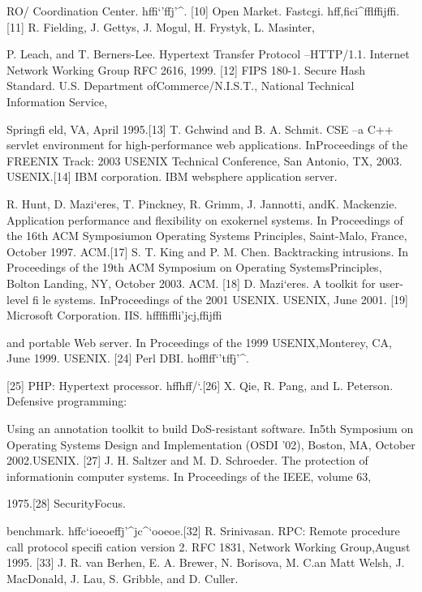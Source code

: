 RO/ Coordination Center. h\Sigma \Sigma \Upsilon \Phi \Psi \Psi \Omega \Omega \Omega ffi`'\Sigma ffj'^.
[10] Open Market. Fastcgi. h\Sigma \Sigma \Upsilon \Phi \Psi \Psi \Omega \Omega \Omega ff,fic\Sigma i^fflffijffi.[11] R. Fielding, J. Gettys, J. Mogul, H. Frystyk, L. Masinter,

P. Leach, and T. Berners-Lee. Hypertext Transfer Protocol --HTTP/1.1. Internet Network Working Group RFC 2616, 1999.
[12] FIPS 180-1. Secure Hash Standard. U.S. Department ofCommerce/N.I.S.T., National Technical Information Service,

Springfi eld, VA, April 1995.[13] T. Gchwind and B. A. Schmit. CSE --a C++ servlet
environment for high-performance web applications. InProceedings of the FREENIX Track: 2003 USENIX Technical
Conference, San Antonio, TX, 2003. USENIX.[14] IBM corporation. IBM websphere application server.

R. Hunt, D. Mazi`eres, T. Pinckney, R. Grimm, J. Jannotti, andK. Mackenzie. Application performance and flexibility on
exokernel systems. In Proceedings of the 16th ACM Symposiumon Operating Systems Principles, Saint-Malo, France, October
1997. ACM.[17] S. T. King and P. M. Chen. Backtracking intrusions. In
Proceedings of the 19th ACM Symposium on Operating SystemsPrinciples, Bolton Landing, NY, October 2003. ACM.
[18] D. Mazi`eres. A toolkit for user-level fi le systems. InProceedings of the 2001 USENIX. USENIX, June 2001.
[19] Microsoft Corporation. IIS. h\Sigma \Sigma \Upsilon \Phi \Psi \Psi \Omega \Omega \Omega ffffiffli'jcj,\Sigma ffijffi\Psi 

and portable Web server. In Proceedings of the 1999 USENIX,Monterey, CA, June 1999. USENIX.
[24] Perl DBI. h\Sigma \Sigma \Upsilon \Phi \Psi \Psi *offlff\Upsilon `'tffj'^.

[25] PHP: Hypertext processor. h\Sigma \Sigma \Upsilon \Phi \Psi \Psi \Omega \Omega \Omega ff\Upsilon h\Upsilon ff/`\Sigma .[26] X. Qie, R. Pang, and L. Peterson. Defensive programming:

Using an annotation toolkit to build DoS-resistant software. In5th Symposium on Operating Systems Design and
Implementation (OSDI '02), Boston, MA, October 2002.USENIX.
[27] J. H. Saltzer and M. D. Schroeder. The protection of informationin computer systems. In Proceedings of the IEEE, volume 63,

1975.[28] SecurityFocus.

benchmark. h\Sigma \Sigma \Upsilon \Phi \Psi \Psi \Omega \Omega \Omega ffc\Upsilon `ioeoeffj'^\Psi jc^\Psi \Omega `ooeoe\Psi .[32] R. Srinivasan. RPC: Remote procedure call protocol
specifi cation version 2. RFC 1831, Network Working Group,August 1995.
[33] J. R. van Berhen, E. A. Brewer, N. Borisova, M. C.an Matt Welsh, J. MacDonald, J. Lau, S. Gribble, and D. Culler.

